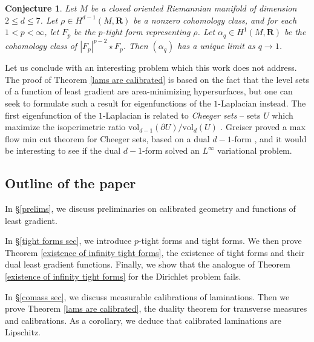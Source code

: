 \documentclass[reqno,11pt]{amsart}
\newcommand{\RR}{\mathbf{R}}
\newcommand{\vol}{\mathrm{vol}}
\newcommand{\dfn}[1]{\emph{#1}\index{#1}}
\newtheorem{conjecture}[theorem]{Conjecture}
\theoremstyle{definition}
\numberwithin{equation}{section}
\begin{document}
\begin{conjecture}
Let $M$ be a closed oriented Riemannian manifold of dimension $2 \leq d \leq 7$.
Let $\rho \in H^{d - 1}(M, \RR)$ be a nonzero cohomology class, and for each $1 < p < \infty$, let $F_p$ be the $p$-tight form representing $\rho$.
Let $\alpha_q \in H^1(M, \RR)$ be the cohomology class of $|F_p|^{p - 2} \star F_p$.
Then $(\alpha_q)$ has a unique limit as $q \to 1$.
\end{conjecture}

Let us conclude with an interesting problem which this work does not address.
The proof of Theorem \ref{lams are calibrated} is based on the fact that the level sets of a function of least gradient are area-minimizing hypersurfaces, but one can seek to formulate such a result for eigenfunctions of the $1$-Laplacian instead.
The first eigenfunction of the $1$-Laplacian is related to \dfn{Cheeger sets} -- sets $U$ which maximize the isoperimetric ratio $\vol_{d - 1}(\partial U)/\vol_d(U)$ \cite{Kawohl2003}.
Greiser proved a max flow min cut theorem for Cheeger sets, based on a dual $d - 1$-form \cite{Grieser05}, and it would be interesting to see if the dual $d - 1$-form solved an $L^\infty$ variational problem.


\subsection{Outline of the paper}
In \S\ref{prelims}, we discuss preliminaries on calibrated geometry and functions of least gradient.

In \S\ref{tight forms sec}, we introduce $p$-tight forms and tight forms.
We then prove Theorem \ref{existence of infinity tight forms}, the existence of tight forms and their dual least gradient functions.
Finally, we show that the analogue of Theorem \ref{existence of infinity tight forms} for the Dirichlet problem fails.

In \S\ref{comass sec}, we discuss measurable calibrations of laminations.
Then we prove Theorem \ref{lams are calibrated}, the duality theorem for transverse measures and calibrations.
As a corollary, we deduce that calibrated laminations are Lipschitz.

\end{document}
